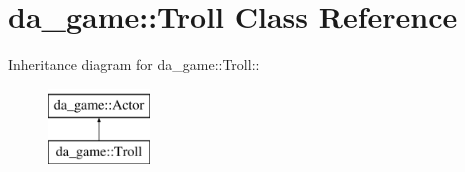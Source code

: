 \hypertarget{classda__game_1_1Troll}{
\section{da\_\-game::Troll Class Reference}
\label{classda__game_1_1Troll}
}
Inheritance diagram for da\_\-game::Troll::\begin{figure}[H]
\begin{center}
\leavevmode
\includegraphics[height=2cm]{classda__game_1_1Troll}
\end{center}
\end{figure}
